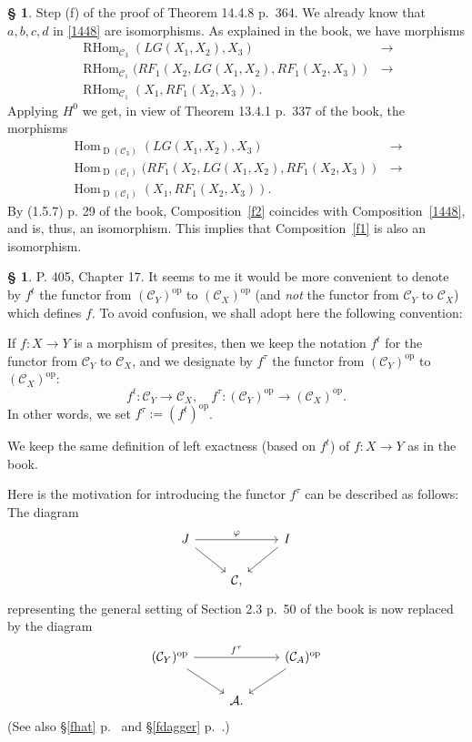 \documentclass[12pt]{article}
\theoremstyle{remark}
\theoremstyle{definition}
\newtheorem{s}[thm]{\S}
\newcommand{\oo}{\operatorname}
\newcommand{\A}{\mathcal A}
\newcommand{\C}{\mathcal C}
\newcommand{\pp}{\varphi}
\DeclareMathOperator{\op}{op}
\begin{document}
%
%
\begin{s}\label{1448f}
Step (f) of the proof of Theorem 14.4.8 p.~364. We already know that $a,b,c,d$ in \eqref{1448} are isomorphisms. As explained in the book, we have morphisms  
\begin{equation}\label{f1}
\begin{split}
\oo{RHom}_{\C_3}(LG(X_1,X_2),X_3)&\to\\ 
\oo{RHom}_{\C_1}(RF_1(X_2,LG(X_1,X_2),RF_1(X_2,X_3))&\to\\ 
\oo{RHom}_{\C_1}(X_1,RF_1(X_2,X_3)).
\end{split}
\end{equation}
Applying $H^0$ we get, in view of Theorem 13.4.1 p.~337 of the book, the morphisms 
\begin{equation}\label{f2}
\begin{split}
\oo{Hom}_{\oo D(\C_3)}(LG(X_1,X_2),X_3)&\to\\ 
\oo{Hom}_{\oo D(\C_1)}(RF_1(X_2,LG(X_1,X_2),RF_1(X_2,X_3))&\to\\ 
\oo{Hom}_{\oo D(\C_1)}(X_1,RF_1(X_2,X_3)).
\end{split}
\end{equation}
By (1.5.7) p. 29 of the book, Composition~\eqref{f2} coincides with Composition~\eqref{1448}, and is, thus, an isomorphism. This implies that Composition~\eqref{f1} is also an isomorphism.
\end{s}
%
%
\begin{s}\label{revol}
P. 405, Chapter 17. It seems to me it would be more convenient to denote by $f^t$ the functor from $(\C_Y)^{\op}$ to $(\C_X)^{\op}$ (and {\em not} the functor from $\C_Y$ to $\C_X$) which defines $f$. To avoid confusion, we shall adopt here the following convention:

If $f:X\to Y$ is a morphism of presites, then we keep the notation $f^t$ for the functor from $\C_Y$ to $\C_X$, and we designate by $f^\tau$ the functor from $(\C_Y)^{\op}$ to $(\C_X)^{\op}$:
\begin{equation}\label{ttau}
f^t:\C_Y\to\C_X,\quad f^\tau:(\C_Y)^{\op}\to(\C_X)^{\op}.
\end{equation}
In other words, we set $f^\tau:=(f^t)^{\op}$. 

We keep the same definition of left exactness (based on $f^t$) of $f:X\to Y$ as in the book.

Here is the motivation for introducing the functor $f^\tau$ can be described as follows: The diagram 
$$
\begin{tikzcd}
J\ar{dr}\ar{rr}{\pp}&&I\ar{dl}\\ 
{}&\C,
\end{tikzcd}
$$ 
representing the general setting of Section 2.3 p.~50 of the book is now replaced by the diagram 
$$
\begin{tikzcd}
(\C_Y)^{\op}\ar{dr}\ar{rr}{f^\tau}&&(\C_A)^{\op}\ar{dl}\\ 
{}&\A.
\end{tikzcd}
$$ 
(See also \S\ref{fhat} p.~\pageref{fhat} and \S\ref{fdagger} p.~\pageref{fdagger}.)
\end{s}
\end{document}
